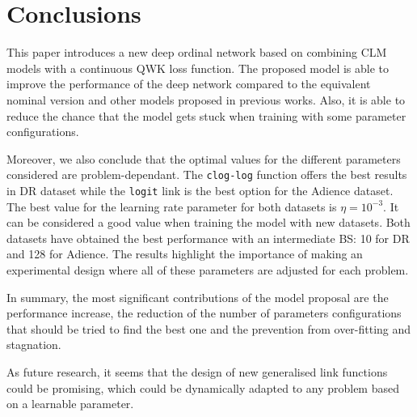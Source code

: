 \documentclass[journal]{IEEEtran}
\begin{document}
	\section{Conclusions}
	\label{sect:conclusions}
	
	This paper introduces a new deep ordinal network based on combining CLM models with a continuous QWK loss function. The proposed model is able to improve the performance of the deep network compared to the equivalent nominal version and other models proposed in previous works. Also, it is able to reduce the chance that the model gets stuck when training with some parameter configurations. 
	
	Moreover, we also conclude that the optimal values for the different parameters considered are problem-dependant. The \texttt{clog-log} function offers the best results in DR dataset while the \texttt{logit} link is the best option for the Adience dataset. The best value for the learning rate parameter for both datasets is $\eta = 10^{-3}$. It can be considered a good value when training the model with new datasets. Both datasets have obtained the best performance with an intermediate BS: 10 for DR and 128 for Adience. The results highlight the importance of making an experimental design where all of these parameters are adjusted for each problem. 
	
	In summary, the most significant contributions of the model proposal are the performance increase, the reduction of the number of parameters configurations that should be tried to find the best one and the prevention from over-fitting and stagnation.
	
	As future research, it seems that the design of new generalised link functions could be promising, which could be dynamically adapted to any problem based on a learnable parameter. 
	
	

	
	
	
\end{document}
